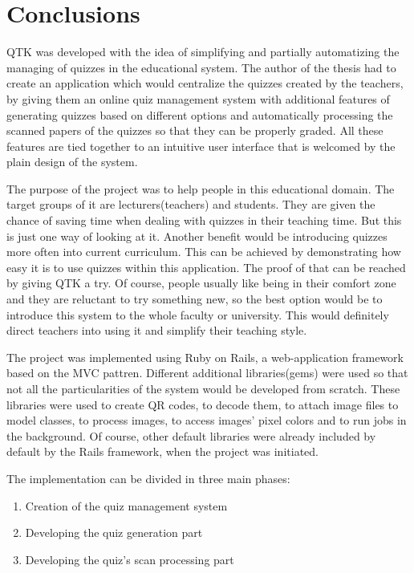 \section*{Conclusions}


QTK was developed with the idea of simplifying and partially automatizing the managing of quizzes in the educational system. The author of the thesis had to create an application which would centralize the quizzes created by the teachers, by giving them an online quiz management system with additional features of generating quizzes based on different options and automatically processing the scanned papers of the quizzes so that they can be properly graded. All these features are tied together to an intuitive user interface that is welcomed by the plain design of the system. 

The purpose of the project was to help people in this educational domain. The target groups of it are lecturers(teachers) and students. They are given the chance of saving time when dealing with quizzes in their teaching time. But this is just one way of looking at it. Another benefit would be introducing quizzes more often into current curriculum. This can be achieved by demonstrating how easy it is to use quizzes within this application. The proof of that can be reached by giving QTK a try. Of course, people usually like being in their comfort zone and they are reluctant to try something new, so the best option would be to introduce this system to the whole faculty or university. This would definitely direct teachers into using it and simplify their teaching style. 

The project was implemented using Ruby on Rails, a web-application framework based on the MVC pattren. Different additional libraries(gems) were used so that not all the particularities of the system would be developed from scratch. These libraries were used to create QR codes, to decode them, to attach image files to model classes, to process images, to access images' pixel colors and to run jobs in the background. Of course, other default libraries were already included by default by the Rails framework, when the project was initiated. 

The implementation can be divided in three main phases:
\begin{enumerate}
  \item Creation of the quiz management system
  \item Developing the quiz generation part
  \item Developing the quiz's scan processing part
\end{enumerate}

